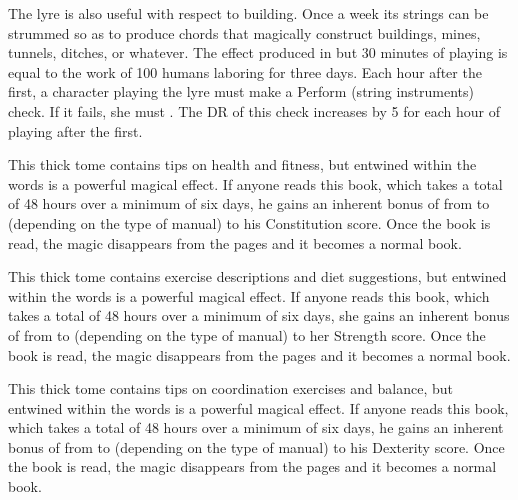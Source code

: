 {The lyre is also useful with respect to building. Once a week its strings can be strummed so as to produce chords that magically construct buildings, mines, tunnels, ditches, or whatever. The effect produced in but 30 minutes of playing is equal to the work of 100 humans laboring for three days. Each hour after the first, a character playing the lyre must make a  Perform (string instruments) check. If it fails, she must . The DR of this check increases by 5 for each hour of playing after the first.


 This thick tome contains tips on health and fitness, but entwined within the words is a powerful magical effect. If anyone reads this book, which takes a total of 48 hours over a minimum of six days, he gains an inherent bonus of from  to  (depending on the type of manual) to his Constitution score. Once the book is read, the magic disappears from the pages and it becomes a normal book. 


 This thick tome contains exercise descriptions and diet suggestions, but entwined within the words is a powerful magical effect. If anyone reads this book, which takes a total of 48 hours over a minimum of six days, she gains an inherent bonus of from  to  (depending on the type of manual) to her Strength score. Once the book is read, the magic disappears from the pages and it becomes a normal book. 


 This thick tome contains tips on coordination exercises and balance, but entwined within the words is a powerful magical effect. If anyone reads this book, which takes a total of 48 hours over a minimum of six days, he gains an inherent bonus of from  to  (depending on the type of manual) to his Dexterity score. Once the book is read, the magic disappears from the pages and it becomes a normal book. 

}
